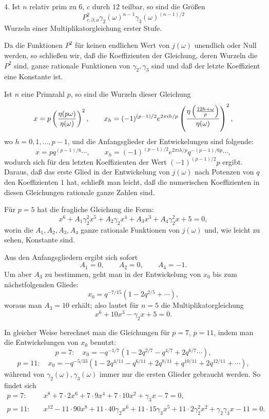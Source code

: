 \documentclass[11pt]{article}
\begin{document}
4. Ist $n$ relativ prim zu $6$, $c$ durch $12$ teilbar, so sind die Größen
\[
 P_{c,\partial,a}^{2}\gamma_2(\omega)^{n-1}\gamma_3(\omega)^{(n-1)/2}
\]
Wurzeln einer Multiplikatorgleichung erster Stufe.

Da die Funktionen $P^2$ für keinen endlichen Wert von $j(\omega)$ unendlich oder Null werden, so schließen wir, daß die Koeffizienten der Gleichung, deren Wurzeln die $P^2$ sind, ganze rationale Funktionen von $\gamma_2,\gamma_3$ sind und daß der letzte Koeffizient eine Konstante ist.

Ist $n$ eine Primzahl $p$, so sind die Wurzeln dieser Gleichung
\[
 x=p\left({\eta(p\omega)\over\eta(\omega)}\right)^2,
 \qquad
 x_h=(-1)^{(p-1)/2}e^{2\pi i h/p}\left({\eta\left({12h+\omega\over p}\right)
 \over\eta(\omega)}\right)^2,
\]
wo $h=0,1,\ldots,p-1$, und die Anfangsglieder der Entwickelungen sind folgende:
\[
 x=pq^{(p-1)/6}\cdots,
 \qquad
 x_h=(-1)^{(p-1)/2}e^{2\pi ih/p}q^{-(p-1)/6p}\cdots,
\]
wodurch sich für den letzten Koeffizienten der Wert $(-1)^{(p-1)/2}p$ ergibt. Daraus, daß das erste Glied in der Entwickelung von $j(\omega)$ nach Potenzen von $q$ den Koeffizienten $1$ hat, schließt man leicht, daß die numerischen Koeffizienten in diesen Gleichungen rationale ganze Zahlen sind.

Für $p=5$ hat die fragliche Gleichung die Form:
\[
 x^6+A_1\gamma_2^2x^5+A_2\gamma_2x^4+A_3x^3+A_4\gamma_2^2x+5=0,
\]
worin die $A_1,A_2,A_3,A_4$ ganze rationale Funktionen von $j(\omega)$ und, wie leicht zu sehen, Konstante sind.

Aus den Anfangsgliedern ergibt sich sofort
\[
 A_1=0,
 \qquad A_2=0,
 \qquad A_4=-1.
\]
Um aber $A_3$ zu bestimmen, geht man in der Entwickelung von $x_0$ bis zum nächstfolgenden Gliede:
\[
 x_0=q^{-7/15}(1-2q^{2/5}+\cdots),
\]
woraus man $A_3=10$ erhält; also lautet für $n=5$ die Multiplikatorgleichung
\begin{equation}
 x^6+10x^3-\gamma_2x+5=0.
\tag{8}
\end{equation}

In gleicher Weise berechnet man die Gleichungen für $p=7$, $p=11$, indem man die Entwickelungen von $x_0$ benutzt:
\[
 p=7:\quad x_0=-q^{-1/7}(1-2q^{2/7}-q^{4/7}+2q^{6/7}\cdots),
\]
\[
 p=11:\quad x_0=-q^{-5/33}(1-2q^{4/11}-q^{6/11}+2q^{8/11}+q^{10/11}+2q^{12/11}+\cdots),
\]
während von $\gamma_2(\omega),\gamma_3(\omega)$ immer nur die ersten Glieder gebraucht werden. So findet sich
\begin{align}
 p=7:\quad& x^8+7\cdot2x^6+7\cdot9x^4+7\cdot10x^2+\gamma_3x-7=0,
\tag{9}\\
 p=11:\quad& x^{12}-11\cdot90x^8+11\cdot40\gamma_2x^6+11\cdot15\gamma_3x^5
 +11\cdot2\gamma_2^2x^2+\gamma_2\gamma_3x-11=0.
\tag{10}
\end{align}
\end{document}
